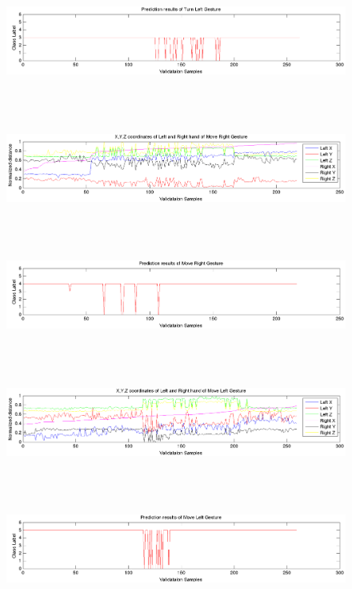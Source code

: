 \label{ev:test:prediction} 
\begin{figure}
	\hspace{-15 mm} 
	\includegraphics[height=37mm]{figures/result/test-prediction-turn-left.png} 
\end{figure}
\begin{figure}
	\hspace{-15 mm} 
	\includegraphics[height=37mm]{figures/result/test-axis-move-right.png} 
\end{figure}
\begin{figure}
	\hspace{-15 mm} 
	\includegraphics[height=37mm]{figures/result/test-prediction-move-right.png} 
\end{figure}
\begin{figure}
	\hspace{-15 mm} 
	\includegraphics[height=37mm]{figures/result/test-axis-move-left.png} 
\end{figure}
\begin{figure}
	\hspace{-15 mm} 
	\includegraphics[height=37mm]{figures/result/test-prediction-move-left.png} 
\end{figure}
